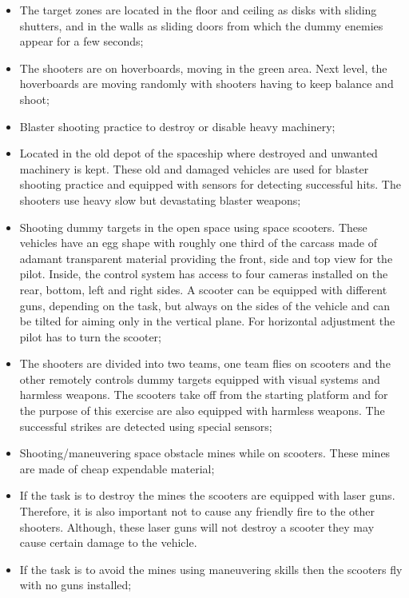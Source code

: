 \documentclass{article}
\begin{document}
\begin{itemize}
\begin{enumerate}
    \end{enumerate}

  \item The target zones are located in the floor and ceiling as disks with
    sliding shutters, and in the walls as sliding doors from which the dummy
    enemies appear for a few seconds;

  \item The shooters are on hoverboards, moving in the green area. Next level, the
    hoverboards are moving randomly with shooters having to keep balance and
    shoot;

  \item Blaster shooting practice to destroy or disable heavy machinery;

  \item Located in the old depot of the spaceship where destroyed and unwanted
    machinery is kept. These old and damaged vehicles are used for blaster
    shooting practice and equipped with sensors for detecting successful hits.
    The shooters use heavy slow but devastating blaster weapons;

  \item Shooting dummy targets in the open space using space scooters. These
    vehicles have an egg shape with roughly one third of the carcass made of
    adamant transparent material providing the front, side and top view for the
    pilot. Inside, the control system has access to four cameras installed on
    the rear, bottom, left and right sides. A scooter can be equipped with
    different guns, depending on the task, but always on the sides of the
    vehicle and can be tilted for aiming only in the vertical plane. For
    horizontal adjustment the pilot has to turn the scooter;

  \item The shooters are divided into two teams, one team flies on scooters and
    the other remotely controls dummy targets equipped with visual systems and
    harmless weapons. The scooters take off from the starting platform and for
    the purpose of this exercise are also equipped with harmless weapons. The
    successful strikes are detected using special sensors;

  \item Shooting/maneuvering space obstacle mines while on scooters. These mines
    are made of cheap expendable material;

  \item If the task is to destroy the mines the scooters are equipped with laser
    guns. Therefore, it is also important not to cause any friendly fire to the
    other shooters. Although, these laser guns will not destroy a scooter they
    may cause certain damage to the vehicle.

  \item If the task is to avoid the mines using maneuvering skills then the
    scooters fly with no guns installed;

\end{itemize}
\end{document}
